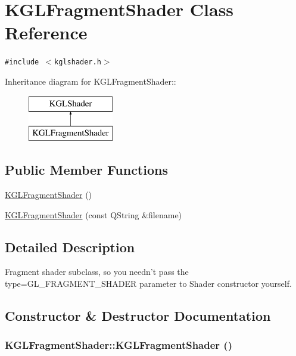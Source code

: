 \hypertarget{class_k_g_l_fragment_shader}{
\section{KGLFragmentShader Class Reference}
\label{class_k_g_l_fragment_shader}
}
{\tt \#include $<$kglshader.h$>$}

Inheritance diagram for KGLFragmentShader::\begin{figure}[H]
\begin{center}
\leavevmode
\includegraphics[height=2cm]{class_k_g_l_fragment_shader}
\end{center}
\end{figure}
\subsection*{Public Member Functions}
\begin{CompactItemize}
\item 
\hyperlink{class_k_g_l_fragment_shader_6cb6f1dc7de6a8ce0930a3cb14116444}{KGLFragmentShader} ()
\item 
\hyperlink{class_k_g_l_fragment_shader_63789f9dfc6cfe19d7423ff6540ca53d}{KGLFragmentShader} (const QString \&filename)
\end{CompactItemize}


\subsection{Detailed Description}
Fragment shader subclass, so you needn't pass the type=GL\_\-FRAGMENT\_\-SHADER parameter to Shader constructor yourself. 

\subsection{Constructor \& Destructor Documentation}
\hypertarget{class_k_g_l_fragment_shader_6cb6f1dc7de6a8ce0930a3cb14116444}{
\subsubsection[{KGLFragmentShader}]{\setlength{\rightskip}{0pt plus 5cm}KGLFragmentShader::KGLFragmentShader ()}}
\label{class_k_g_l_fragment_shader_6cb6f1dc7de6a8ce0930a3cb14116444}


